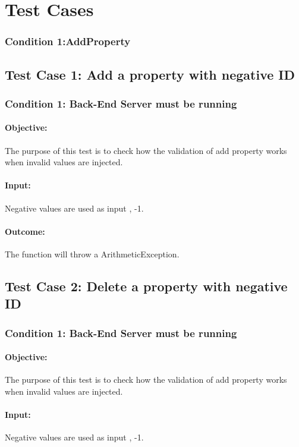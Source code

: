 \documentclass[a4paper,12pt]{article}
\begin{document}
\section{Test Cases}
\subsubsection{Condition 1:AddProperty}

\subsection{Test Case 1: Add a property with negative ID}
\subsubsection{Condition 1: Back-End Server must be running}
\paragraph{Objective:}The purpose of this test is to check how the validation of add property works when invalid values are injected. 
\paragraph{Input:} Negative values are used as input , -1.
\paragraph{Outcome: } The function will throw a ArithmeticException.

\subsection{Test Case 2: Delete a property with negative ID}
\subsubsection{Condition 1: Back-End Server must be running}
\paragraph{Objective:}The purpose of this test is to check how the validation of add property works when invalid values are injected.
\paragraph{Input:} Negative values are used as input , -1.
\end{document}
